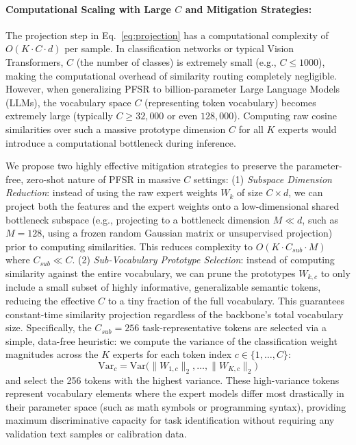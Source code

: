 \paragraph{Computational Scaling with Large $C$ and Mitigation Strategies:} 
The projection step in Eq.~\ref{eq:projection} has a computational complexity of $O(K \cdot C \cdot d)$ per sample. In classification networks or typical Vision Transformers, $C$ (the number of classes) is extremely small (e.g., $C \le 1000$), making the computational overhead of similarity routing completely negligible. However, when generalizing PFSR to billion-parameter Large Language Models (LLMs), the vocabulary space $C$ (representing token vocabulary) becomes extremely large (typically $C \ge 32,000$ or even $128,000$). Computing raw cosine similarities over such a massive prototype dimension $C$ for all $K$ experts would introduce a computational bottleneck during inference. 

We propose two highly effective mitigation strategies to preserve the parameter-free, zero-shot nature of PFSR in massive $C$ settings: (1) \emph{Subspace Dimension Reduction}: instead of using the raw expert weights $W_k$ of size $C \times d$, we can project both the features and the expert weights onto a low-dimensional shared bottleneck subspace (e.g., projecting to a bottleneck dimension $M \ll d$, such as $M=128$, using a frozen random Gaussian matrix or unsupervised projection) prior to computing similarities. This reduces complexity to $O(K \cdot C_{sub} \cdot M)$ where $C_{sub} \ll C$. (2) \emph{Sub-Vocabulary Prototype Selection}: instead of computing similarity against the entire vocabulary, we can prune the prototypes $W_{k,c}$ to only include a small subset of highly informative, generalizable semantic tokens, reducing the effective $C$ to a tiny fraction of the full vocabulary. This guarantees constant-time similarity projection regardless of the backbone's total vocabulary size. Specifically, the $C_{sub}=256$ task-representative tokens are selected via a simple, data-free heuristic: we compute the variance of the classification weight magnitudes across the $K$ experts for each token index $c \in \{1, \dots, C\}$:
\begin{equation}
\text{Var}_c = \text{Var}\Big( \|W_{1, c}\|_2, \dots, \|W_{K, c}\|_2 \Big)
\label{eq:variance_pruning}
\end{equation}
and select the 256 tokens with the highest variance. These high-variance tokens represent vocabulary elements where the expert models differ most drastically in their parameter space (such as math symbols or programming syntax), providing maximum discriminative capacity for task identification without requiring any validation text samples or calibration data. 

